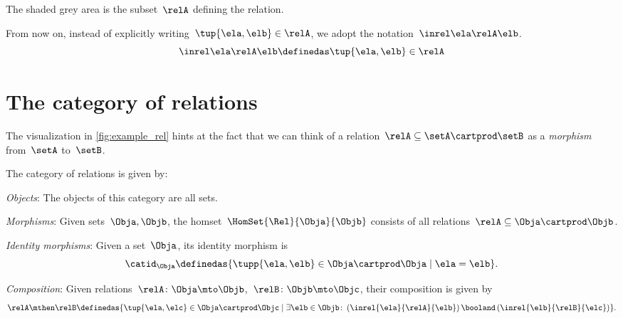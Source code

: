 The shaded grey area is the subset~$\relA$ defining the relation.

\begin{remark}
    From now on, instead of explicitly writing~$\tup{\ela,\elb}\in \relA$, we adopt the notation~$\inrel \ela \relA \elb$.
    \begin{equation}
        \inrel \ela \relA \elb \definedas \tup{\ela,\elb}\in \relA
    \end{equation}
\end{remark}


\section{The category of relations \Rel}

The visualization in \cref{fig:example_rel} hints at the fact that we can think of a relation~$\relA \subseteq \setA \cartprod \setB$ as a \emph{morphism} from~$\setA$ to~$\setB$.


\begin{ctdefinition}
    \label{def:Rel}
    The category of relations \iindex{\Rel}  is given by:
    \begin{compactenum}
        \item \emph{Objects}: The objects of this category are all sets.
        \item \emph{Morphisms}: Given sets~$\Obja, \Objb$, the homset~$\HomSet{\Rel}{\Obja}{\Objb}$ consists of all relations~$\relA\subseteq \Obja\cartprod \Objb$.
        \item \emph{Identity morphisms}: Given a set~$\Obja$, its identity morphism is
        \begin{equation}
            \catid_\Obja \definedas \{ \tupp{\ela,\elb} \in \Obja \cartprod \Obja \mid  \ela = \elb \}.
        \end{equation}
        \item \emph{Composition}: Given relations~$\relA \colon \Obja\mto \Objb$,~$\relB \colon \Objb\mto \Objc$, their composition is given by
        \begin{equation}
            \label{eq:RelCompRule}
            \relA \mthen \relB \definedas \{\tup{\ela,\elc} \in \Obja \cartprod \Objc \mid  \exists \elb \in \Objb \colon \left(\inrel{\ela}{\relA}{\elb} \right) \booland \left(\inrel{\elb}{\relB}{\elc}\right)\}.
        \end{equation}
    \end{compactenum}
\end{ctdefinition}

